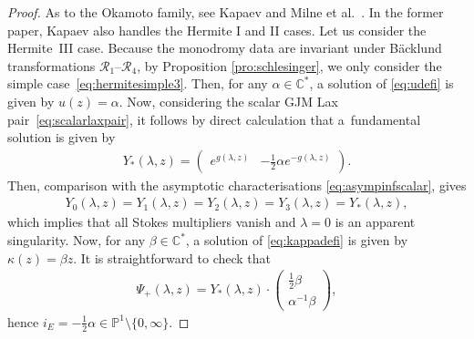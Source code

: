 \documentclass[pdftex]{sigma}
\numberwithin{equation}{section}
\begin{document}
\begin{proof}
	As to the Okamoto family, see Kapaev \cite{kapaev1998} and Milne et al.~\cite{milne}. In the former paper, Kapaev also handles the Hermite I and
	II cases. Let us consider the Hermite~III case. Because the monodromy data are invariant under B\"acklund transformations $\mathcal{R}_1$--$\mathcal{R}_4$, by Proposition \ref{pro:schlesinger}, we only consider the simple case~\eqref{eq:hermitesimple3}. Then, for any $\alpha\in\mathbb{C}^*$, a solution of \eqref{eq:udefi} is given by $u(z)=\alpha$. Now, 	considering the scalar GJM Lax pair~\eqref{eq:scalarlaxpair}, it follows by direct calculation that a~fundamental solution is given by
	\begin{gather*}
	Y_*(\lambda,z)=\begin{pmatrix}
	e^{g(\lambda,z)} & -\tfrac{1}{2}\alpha e^{-g(\lambda,z)}
	\end{pmatrix}.
	\end{gather*}
	Then, comparison with the asymptotic characterisations \eqref{eq:asympinfscalar}, gives
	\begin{gather*}
	Y_0(\lambda,z)=Y_1(\lambda,z)=Y_2(\lambda,z)=Y_3(\lambda,z)=Y_*(\lambda,z),
	\end{gather*}
	which implies that all Stokes multipliers vanish and $\lambda=0$ is an apparent singularity.
Now, for any $\beta\in\mathbb{C}^*$, a solution of \eqref{eq:kappadefi} is given by $\kappa(z)=\beta z$. It is straightforward to check that
 	\begin{gather*}
 	\Psi_+(\lambda,z)=Y_*(\lambda,z)\cdot \begin{pmatrix}
 	\tfrac{1}{2}\beta\\
 	\alpha^{-1}\beta
 	\end{pmatrix},
 	\end{gather*}
 hence $i_E=-\tfrac{1}{2}\alpha\in\mathbb{P}^1\setminus\{0,\infty\}$.	
\end{proof}
\end{document}
